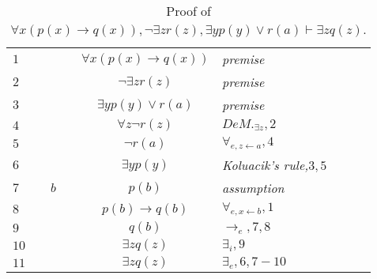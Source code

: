 \documentclass[12pt]{article}
\begin{document}
\begin{table}[H]
	\centering
	\caption{Proof of $\forall x(p(x) \rightarrow q(x)), \neg\exists zr(z), \exists yp(y) \lor r(a) \vdash \exists zq(z)$.}
	\vspace{0.5cm}
	\begin{tabular}{llllcllll}
		$1$ & & & & $\forall x(p(x) \rightarrow q(x))$ & \textit{premise} & & & \\
		$2$ & & & & $\neg\exists zr(z)$ & \textit{premise} & & & \\
		$3$ & & & & $\exists yp(y) \lor r(a)$ & \textit{premise} & & \\
		$4$ & & & & $\forall z\neg r(z)$ & $DeM._{\exists z},2$  & & & \\
		$5$ & & & & $\neg r(a)$ & $\forall _{e,z\leftarrow a},4$ & & & \\
		$6$ & & & & $\exists yp(y)$ & \textit{Koluacik's rule,}$3,5$ & & & \\\cline{2-9}
		$7$ &\multicolumn{1}{|c}{} &$b$& & $p(b)$ & \textit{assumption} & &&\multicolumn{1}{c|}{} \\
		$8$ &\multicolumn{1}{|c}{} & & & $p(b)\rightarrow q(b)$ & $\forall _{e, x \leftarrow b},1$ & & &\multicolumn{1}{c|}{} \\
		$9$ &\multicolumn{1}{|c}{} && & $q(b)$ & $\rightarrow _e, 7,8$ & &&\multicolumn{1}{c|}{} \\
		$10$ &\multicolumn{1}{|c}{} && & $\exists zq(z)$ & $\exists _i, 9$ & &&\multicolumn{1}{c|}{} \\\cline{2-9}
		$11$ & & & & $\exists zq(z)$ & $\exists _e,6,7-10$& & & \\
	\end{tabular}\\
	\vspace{0.5cm}

	
\end{table}
\end{document}
